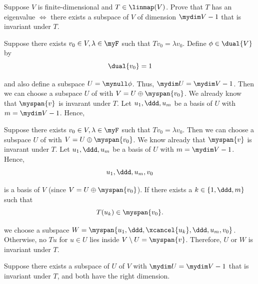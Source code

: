 \begin{xrcs}
  Suppose $V$ is finite-dimensional and $T \in \linmap(V)$. Prove that $T$ has an eigenvalue $\iff$ there exists a subspace of $V$ of dimension $\mydim V - 1$ that is invariant under $T$.

  \begin{xprf}
    Suppose there exists $v_0 \in V, \lambda \in \myF$ such that $Tv_0 = \lambda v_0$. Define $\phi \in \dual{V}$ by
    \begin{equation}
      \dual{v_0} = 1
    \end{equation}

    and also define a subspace $U = \mynull \phi$. Thus, $\mydim U = \mydim V - 1$.
    Then we can choose a subspace $U$ of with $V = U \oplus \myspan{v_0}$. We already know that $\myspan{v}$ is invarant under $T$. Let $u_1, \ddd, u_{m}$ be a basis of $U$ with $m = \mydim V - 1$. Hence,
  \end{xprf}

  \begin{xprf}
    \Rightarrowdirection Suppose there exists $v_0 \in V, \lambda \in \myF$ such that $Tv_0 = \lambda v_0$. Then we can choose a subspace $U$ of with $V = U \oplus \myspan{v_0}$. We know already that $\myspan{v}$ is invarant under $T$. Let $u_1, \ddd, u_{m}$ be a basis of $U$ with $m = \mydim V - 1$. Hence,
    \begin{equation}
      u_1, \ddd, u_{m}, v_0
    \end{equation}

    is a basis of $V$ (since $V = U \oplus \myspan{v_0}$). If there exists a $k \in \{1, \ddd, m\}$ such that
    \begin{equation}
      T(u_k) \in \myspan{v_0}.
    \end{equation}

    we choose a subspace $W = \myspan{u_1, \ddd, \xcancel{u_k}, \ddd, u_m, v_0}$. Otherwise, no $T u$ for $u \in U$ lies inside $V \setminus U = \myspan{v}$. Therefore, $U$ or $W$ is invariant under $T$.

    \Leftarrowdirection Suppose there exists a subspace of $U$ of $V$ with $\mydim U = \mydim V - 1$ that is invariant under $T$, and both have the right dimension.
  \end{xprf}
\end{xrcs}

